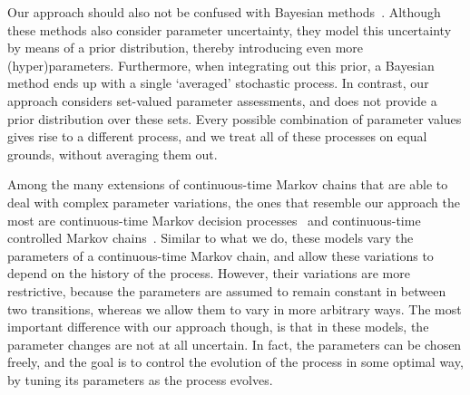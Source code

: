 \documentclass[10pt,a4paper]{paper}
\theoremstyle{definition}
\begin{document}
Our approach should also not be confused with Bayesian methods~\cite{insua2012bayesian}. Although these methods also consider parameter uncertainty, they model this uncertainty by means of a prior distribution, thereby introducing even more (hyper)parameters. Furthermore, when integrating out this prior, a Bayesian method ends up with a single `averaged' stochastic process. In contrast, our approach considers set-valued parameter assessments, and does not provide a prior distribution over these sets. Every possible combination of parameter values gives rise to a different process, and we treat all of these processes on equal grounds, without averaging them out.

Among the many extensions of continuous-time Markov chains that are able to deal with complex parameter variations, the ones that resemble our approach the most are continuous-time Markov decision processes~\cite{Xianping:2009} and continuous-time controlled Markov chains~\cite{guo2003}. Similar to what we do, these models vary the parameters of a continuous-time Markov chain, and allow these variations to depend on the history of the process. However, their variations are more restrictive, because the parameters are assumed to remain constant in between two transitions, whereas we allow them to vary in more arbitrary ways. The most important difference with our approach though, is that in these models, the parameter changes are not at all uncertain. In fact, the parameters can be chosen freely, and the goal is to control the evolution of the process in some optimal way, by tuning its parameters as the process evolves.




\end{document}
